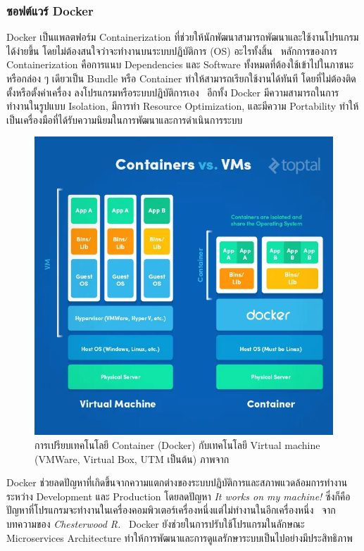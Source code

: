 \documentclass[12pt,one side,openright,a4paper]{cpe-thesis-th}
\newcommand{\thaijustify}[1]{%
  \par\hspace{30pt}\justifying
  #1
}
\begin{document}
        \subsubsection{ซอฟต์แวร์ Docker}
            \thaijustify{
                Docker เป็นแพลตฟอร์ม Containerization ที่ช่วยให้นักพัฒนาสามารถพัฒนาและใช้งานโปรแกรมได้ง่ายขึ้น โดยไม่ต้องสนใจว่าจะทำงานบนระบบปฏิบัติการ (OS) อะไรทั้งสิ้น~\cite{docker} หลักการของการ Containerization คือการแนบ Dependencies และ Software ทั้งหมดที่ต้องใช้เข้าไปในภาชนะหรือกล่อง ๆ เดียวเป็น Bundle หรือ Container ทำให้สามารถเรียกใช้งานได้ทันที โดยที่ไม่ต้องติดตั้งหรือตั้งค่าเครื่อง ลงโปรแกรมหรือระบบปฏิบัติการเอง~\cite{docker, yıldız23docker} อีกทั้ง Docker มีความสามารถในการทำงานในรูปแบบ Isolation, มีการทำ Resource Optimization, และมีความ Portability ทำให้เป็นเครื่องมือที่ได้รับความนิยมในการพัฒนาและการดำเนินการระบบ~\cite{yıldız23docker}
            }
            \begin{figure}[H]
                \centering
                    \includegraphics[width=12cm]{figure/literature/docker-compare.png}
                \caption[ภาพเปรียบเทียบเทคโนโลยี Docker กับ Virtual Machine]{การเปรียบเทคโนโลยี Container (Docker) กับเทคโนโลยี Virtual machine (VMWare, Virtual Box, UTM เป็นต้น) ภาพจาก~\cite{dockerdummies}}\label{fig:lit-docker}
            \end{figure}
            \thaijustify{
                Docker ช่วยลดปัญหาที่เกิดขึ้นจากความแตกต่างของระบบปฏิบัติการและสภาพแวดล้อมการทำงานระหว่าง Development และ Production โดยลดปัญหา \textit{It works on my machine!} ซึ่งก็คือปัญหาที่โปรแกรมจะทำงานในเครื่องคอมพิวเตอร์เครื่องหนึ่งแต่ไม่ทำงานในอีกเครื่องหนึ่ง~\cite{yıldız23docker} จากบทความของ \textit{Chesterwood R.}~\cite{chesterwood21microservice} Docker ยังช่วยในการปรับใช้โปรแกรมในลักษณะ Microservices Architecture ทำให้การพัฒนาและการดูแลรักษาระบบเป็นไปอย่างมีประสิทธิภาพ
            }
\end{document}
